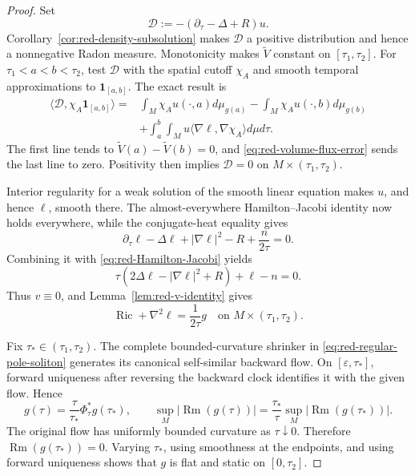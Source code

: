 \documentclass[10pt]{coll-l}
\theoremstyle{definition}
\theoremstyle{remark}
\numberwithin{section}{chapter}
\numberwithin{equation}{chapter}
\newcommand{\Ric}{\operatorname{Ric}}
\newcommand{\Rm}{\operatorname{Rm}}
\begin{document}
\begin{proof}
Set
\begin{equation}
                 \mathcal D
       :=-(\partial_\tau-\Delta+R)u.                    \label{eq:red-defect-measure}
\end{equation}
Corollary~\ref{cor:red-density-subsolution} makes $\mathcal D$ a positive
distribution and hence a nonnegative Radon measure.  Monotonicity makes
$\widetilde V$ constant on $[\tau_1,\tau_2]$.  For
$\tau_1<a<b<\tau_2$, test $\mathcal D$ with the spatial cutoff $\chi_A$ and
smooth temporal approximations to $\mathbf1_{[a,b]}$.  The exact result is
\begin{align}
 \langle\mathcal D,\chi_A\mathbf1_{[a,b]}\rangle
={}&\int_M\chi_Au(\cdot,a)d\mu_{g(a)}
   -\int_M\chi_Au(\cdot,b)d\mu_{g(b)}                  \label{eq:red-defect-cutoff}\\
 &+\int_a^b\!\!\int_M
     u\langle\nabla\ell,\nabla\chi_A\rangle d\mu d\tau.\nonumber
\end{align}
The first line tends to
$\widetilde V(a)-\widetilde V(b)=0$, and
\eqref{eq:red-volume-flux-error} sends the last line to zero.  Positivity
then implies $\mathcal D=0$ on
$M\times(\tau_1,\tau_2)$.

Interior regularity for a weak solution of the smooth linear equation makes
$u$, and hence $\ell$, smooth there.  The almost-everywhere Hamilton--Jacobi
identity now holds everywhere, while the conjugate-heat equality gives
\begin{equation}
 \partial_\tau\ell-\Delta\ell+|\nabla\ell|^2-R
                    +\frac n{2\tau}=0.                 \label{eq:red-ell-conjugate-equality}
\end{equation}
Combining it with \eqref{eq:red-Hamilton-Jacobi} yields
\begin{equation}
 \tau(2\Delta\ell-|\nabla\ell|^2+R)+\ell-n=0.          \label{eq:red-v-zero-bracket}
\end{equation}
Thus $v\equiv0$, and Lemma~\ref{lem:red-v-identity} gives
\begin{equation}
                   \Ric+\nabla^2\ell=\frac1{2\tau}g
       \quad\text{on }M\times(\tau_1,\tau_2).           \label{eq:red-regular-pole-soliton}
\end{equation}

Fix $\tau_*\in(\tau_1,\tau_2)$.  The complete bounded-curvature shrinker
in \eqref{eq:red-regular-pole-soliton} generates its canonical self-similar
backward flow.  On $[\varepsilon,\tau_*]$, forward uniqueness after reversing
the backward clock identifies it with the given flow.  Hence
\begin{equation}
 g(\tau)=\frac\tau{\tau_*}\Phi_\tau^*g(\tau_*),
 \qquad
 \sup_M|\Rm(g(\tau))|
  =\frac{\tau_*}{\tau}\sup_M|\Rm(g(\tau_*))|.           \label{eq:red-regular-pole-scaling}
\end{equation}
The original flow has uniformly bounded curvature as $\tau\downarrow0$.
Therefore $\Rm(g(\tau_*))=0$.  Varying $\tau_*$, using smoothness at the
endpoints, and using forward uniqueness shows that $g$ is flat and static on
$[0,\tau_2]$.


\end{proof}
\end{document}
